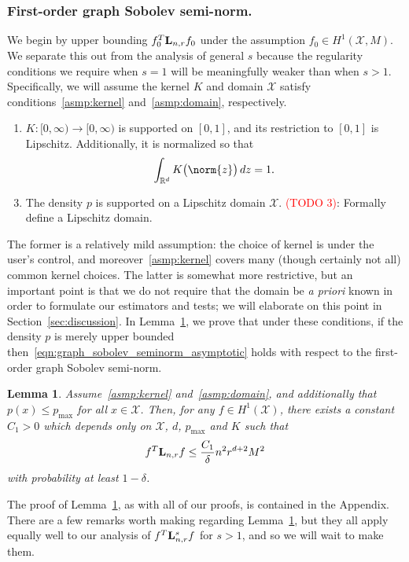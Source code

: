 \documentclass{article}
\newcommand{\Reals}{\mathbb{R}}
\newcommand{\1}{\mathbf{1}}
\newcommand{\Lap}{{\bf L}}
\newcommand{\Xset}{\mathcal{X}}
\theoremstyle{alden}
\theoremstyle{aldenthm}
\newtheorem{lemma}{Lemma}
\theoremstyle{definition}
\theoremstyle{remark}
\begin{document}
\subsubsection{First-order graph Sobolev semi-norm.}
\label{subsec:first_order_graph_sobolev_seminorm}
We begin by upper bounding $f_0^T \Lap_{n,r} f_0$ under the assumption $f_0 \in H^1(\Xset,M)$. We separate this out from the analysis of general $s$ because the regularity conditions we require when $s = 1$ will be meaningfully weaker than when $s > 1$. Specifically, we will assume the kernel $K$ and domain $\Xset$ satisfy conditions~\ref{asmp:kernel} and~\ref{asmp:domain}, respectively.
\begin{enumerate}[label=(K\arabic*)]
	\item
	\label{asmp:kernel}
	$K:[0,\infty) \to [0,\infty)$ is supported on $[0,1]$, and its restriction to $[0,1]$ is Lipschitz. Additionally, it is normalized so that
	\begin{equation*}
	\int_{\Reals^d} K\bigl(\norm{z}\bigr) \,dz = 1.
	\end{equation*}
\end{enumerate}
\begin{enumerate}[label=(P\arabic*)]
	\setcounter{enumi}{2}
	\item 
	\label{asmp:domain}
	The density $p$ is supported on a Lipschitz domain $\Xset$. \textcolor{red}{(TODO 3)}: Formally define a Lipschitz domain.
\end{enumerate}
The former is a relatively mild assumption: the choice of kernel is under the user's control, and moreover~\ref{asmp:kernel} covers many (though certainly not all) common kernel choices. The latter is somewhat more restrictive, but an important point is that we do not require that the domain be \textit{a priori} known in order to formulate our estimators and tests; we will elaborate on this point in Section~\ref{sec:discussion}. In Lemma~\ref{lem:first_order_graph_sobolev_seminorm}, we prove that under these conditions, if the density $p$ is merely upper bounded then~\eqref{eqn:graph_sobolev_seminorm_asymptotic} holds with respect to the first-order graph Sobolev semi-norm.
\begin{lemma}
	\label{lem:first_order_graph_sobolev_seminorm}
	Assume~\ref{asmp:kernel} and~\ref{asmp:domain}, and additionally that $p(x) \leq p_{\max}$ for all $x \in \Xset$. Then, for any $f \in H^1(\Xset)$, there exists a constant $C_1 > 0$ which depends only on $\Xset$, $d$, $p_{\max}$ and $K$ such that
	\begin{equation}
	\label{eqn:first_order_graph_sobolev_seminorm}
	f^T \Lap_{n,r} f \leq \frac{C_1}{\delta} n^2 r^{d + 2} M^2
	\end{equation}
	with probability at least $1 - \delta$.
\end{lemma}
The proof of Lemma~\ref{lem:first_order_graph_sobolev_seminorm}, as with all of our proofs, is contained in the Appendix. There are a few remarks worth making regarding Lemma~\ref{lem:first_order_graph_sobolev_seminorm}, but they all apply equally well to our analysis of $f^T\Lap_{{n,r}}^sf$ for $s > 1$, and so we will wait to make them.
\end{document}
